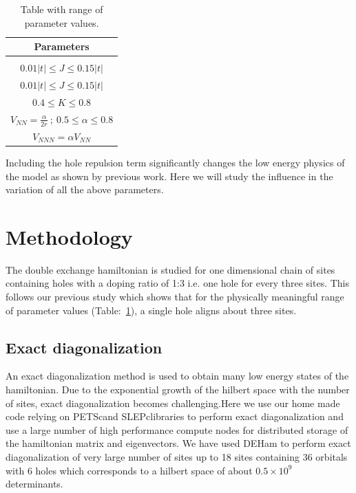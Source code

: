 \documentclass[ openright,titlepage,numbers=noenddot,headinclude,twoside,%
                footinclude=true,cleardoublepage=empty,abstractoff,%
                BCOR=5mm,paper=a4,fontsize=11pt,%
                ngerman,american,%
]{scrreprt}
\newcommand{\citepetsc}{\cite{petsc_web_page,petsc_user_ref,petsc_efficient}}
\newcommand{\citeslepc}{\cite{Hernandez_2003_SSL,slepc_users_manual}}
\begin{document}
\begin{table}[h!]
\centering
\begin{tabular}{||c||}
 \hline
 Parameters  \\ [0.5ex]
 \hline\hline
 \\
    $ 0.01\lvert t \rvert \le J \le 0.15\lvert t \rvert $    \\ [1ex]
    $ 0.01\lvert t \rvert \le J \le 0.15\lvert t \rvert $    \\ [1ex]
    $ 0.4 \le K \le 0.8 $                                    \\ [1ex]
    $ V_{NN} = \frac{\alpha}{2r}\ ;\ 0.5 \le \alpha \le 0.8 $ \\ [1ex]
    $ V_{NNN} = \alpha V_{NN} $                                \\ [1ex]
 \hline
\end{tabular}
\label{tab:params}
\caption{Table with range of parameter values.}
\end{table}

Including the hole repulsion term significantly changes the low energy physics
of the model as shown by previous work\cite{calzado_proposal_2001}. Here we will
study the influence in the variation of all the above parameters.


\chapter{Methodology}

The double exchange hamiltonian is studied for one dimensional chain
of sites containing holes with a doping ratio of 1:3 i.e. one hole for every
three sites. This follows our previous study which shows that for
the physically meaningful range of parameter values (Table:~\ref{tab:params}),
a single hole aligns about three sites.\cite{crystals_chilkuri}

\section{Exact diagonalization}

An exact diagonalization method is used to obtain many low energy states of the
hamiltonian. Due to the exponential growth of the hilbert space with the number
of sites, exact diagonalization becomes challenging.Here we use our home made
code relying on PETSc\citepetsc and SLEPc\citeslepc libraries to perform exact diagonalization and
use a large number of high performance compute nodes for distributed storage of
the hamiltonian matrix and eigenvectors. We have used DEHam\cite{deham} to
perform exact diagonalization of very large number of sites up to 18 sites
containing 36 orbitals with 6 holes which corresponds to a hilbert space of
about $0.5 \times 10^9$ determinants.
\end{document}
